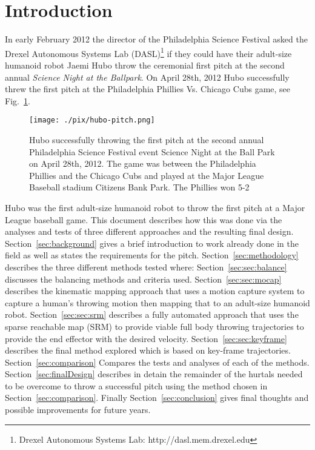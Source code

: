 \section{Introduction}
In early February 2012 the director of the Philadelphia Science Festival asked the Drexel Autonomous Systems Lab (DASL)\footnote{Drexel Autonomous Systems Lab: http://dasl.mem.drexel.edu}\label{foot:dasl} if they could have their adult-size humanoid robot Jaemi Hubo throw the ceremonial first pitch at the second annual \textit{Science Night at the Ballpark}.  On April 28th, 2012 Hubo successfully threw the first pitch at the Philadelphia Phillies Vs. Chicago Cubs game, see Fig.~\ref{fig:hubo-throw}.  

\begin{figure}[t]
  \centering
\texttt{[image: ./pix/hubo-pitch.png]}
  \caption{Hubo successfully throwing the first pitch at the second annual Philadelphia Science Festival event Science Night at the Ball Park on April 28th, 2012.  The game was between the Philadelphia Phillies and the Chicago Cubs and played at the Major League Baseball stadium Citizens Bank Park.  The Phillies won 5-2}
  \label{fig:hubo-throw}
\end{figure}



Hubo was the first adult-size humanoid robot to throw the first pitch at a Major League baseball game.  
This document describes how this was done via the analyses and tests of three different approaches and the resulting final design.
Section~\ref{sec:background} gives a brief introduction to work already done in the field as well as states the requirements for the pitch.
Section~\ref{sec:methodology} describes the three different methods tested where:
Section~\ref{sec:sec:balance} discusses the balancing methods and criteria used.
Section~\ref{sec:sec:mocap} describes the kinematic mapping approach that uses a motion capture system to capture a human's throwing motion then mapping that to an adult-size humanoid robot.  
Section~\ref{sec:sec:srm} describes a fully automated approach that uses the sparse reachable map (SRM) to provide viable full body throwing trajectories to provide the end effector with the desired velocity\cite{dlofaro-srm}.
Section~\ref{sec:sec:keyframe} describes the final method explored which is based on key-frame trajectories.
Section~\ref{sec:comparison} Compares the tests and analyses of each of the methods.
Section~\ref{sec:finalDesign} describes in detain the remainder of the hurtals needed to be overcome to throw a successful pitch using the method chosen in Section~\ref{sec:comparison}.
Finally Section~\ref{sec:conclusion} gives final thoughts and possible improvements for future years.


